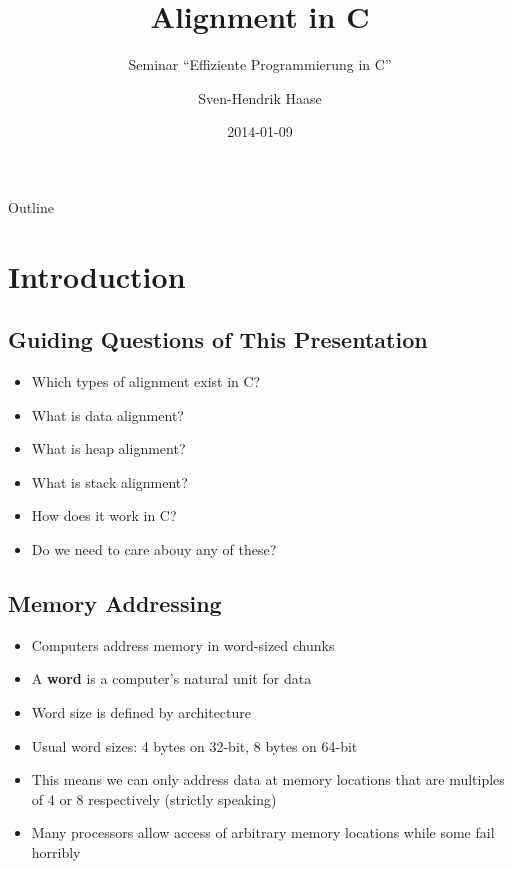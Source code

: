 \documentclass{beamer}
\begin{document}
\title{Alignment in C}
\subtitle{Seminar ``Effiziente Programmierung in C''}
\date{2014-01-09}
\author{Sven-Hendrik Haase}

\begin{frame}
    \titlepage
\end{frame}

\begin{frame}{Outline}
    \tiny
    \tableofcontents
\end{frame}

\section{Introduction}
\subsection{Guiding Questions of This Presentation}
\begin{frame}{\insertsection}{\insertsubsection}
	\begin{itemize}
		\item Which types of alignment exist in C?\pause
		\item What is data alignment?\pause
		\item What is heap alignment?\pause
		\item What is stack alignment?\pause
        \item How does it work in C?\pause
        \item Do we need to care abouy any of these?
	\end{itemize}
\end{frame}

\subsection{Memory Addressing}
\begin{frame}{\insertsection}{\insertsubsection}
	\begin{itemize}
		\item Computers address memory in word-sized chunks\pause
		\item A \textbf{word} is a computer's natural unit for data
		\item Word size is defined by architecture
		\item Usual word sizes: 4 bytes on 32-bit, 8 bytes on 64-bit\pause
		\item This means we can only address data at memory locations that are
			  multiples of 4 or 8 respectively (strictly speaking)
        \item Many processors allow access of arbitrary memory locations while some fail
            horribly
	\end{itemize}
\end{frame}
\end{document}
